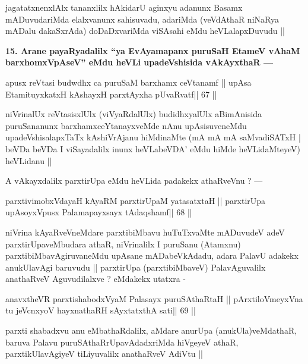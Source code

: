 \begin{artha}
jagatatxnenxlAlx tananxlilx hAkidarU aginxyu adanunx Basamx mADuvudariMda elalxvanunx sahisuvadu, adariMda (veVdAthaR niNaRya mADalu dakaSxrAda) doDaDxvariMda viSAsahi eMdu heVLalapxDuvudu ||
\end{artha}

\begin{artha}
{\bf 15. Arane payaRyadalilx ``ya EvAyamapanx puruSaH EtameV vAhaM barxhomxVpAseV'' eMdu heVLi upadeVshisida vAkAyxthaR ---}
\end{artha}

\begin{shl}
apusx reVtasi budwdhx ca puruSaM barxhamx ceVtanamf ||
upAsa EtamituyxkatxH kAshayxH parxtAyxha pUvaRvatf\hfill || 67 ||
\end{shl}

\begin{artha}
niVrinalUx reVtasisxlUlx (viVyaRdalUlx) budidhxyalUlx aBimAnisida puruSananunx barxhamxceYtanayxveMde nAnu upAsisuveneMdu upadeVshisalapxTaTx kAshiVrAjanu hiMdinaMte (mA mA mA saMvadiSATxH | beVDa beVDa I viSayadalilx inunx heVLabeVDA' eMdu hiMde heVLidaMteyeV) heVLidanu ||
\end{artha}

\begin{artha}
A vAkayxdalilx parxtirUpa eMdu heVLida padakekx athaRveVnu ? ---
\end{artha}

\begin{shl}
parxtivimobxVdayaH kAyaRM parxtirUpaM yatasatxtaH ||
parxtirUpa upAsoyxV\s pusx Palamapayxsayx tAdaqshamf\hfill || 68 ||
\end{shl}

\begin{artha}
niVrina kAyaRveVneMdare parxtibiMbavu huTuTxvaMte mADuvudeV adeV parxtirUpaveMbudara athaR, niVrinalilx I puruSanu (Atamxnu) parxtibiMbavAgiruvaneMdu upAsane mADabeVkAdadu, adara PalavU adakekx anukUlavAgi baruvudu || parxtirUpa (parxtibiMbaveV) PalavAguvalilx anathaRveV Aguvudilalxve ? eMdakekx utatxra - 
\end{artha}

\begin{shl}
anavxtheVR parxtishabodxV\s yaM Palasayx puruSAthaRtaH ||
pArxtiloVmeyxVna tu jeVcnxyoV hayxnathaRH sAyxtatxthA sati\hfill || 69 ||
\end{shl}

\begin{artha}
parxti shabadxvu anu eMbathaRdalilx, aMdare anurUpa (anukUla)veMdathaR, baruva Palavu puruSAthaRrUpavAdadxriMda hiVgeyeV athaR, parxtikUlavAgiyeV tiLiyuvalilx anathaRveV AdiVtu ||
\end{artha}

